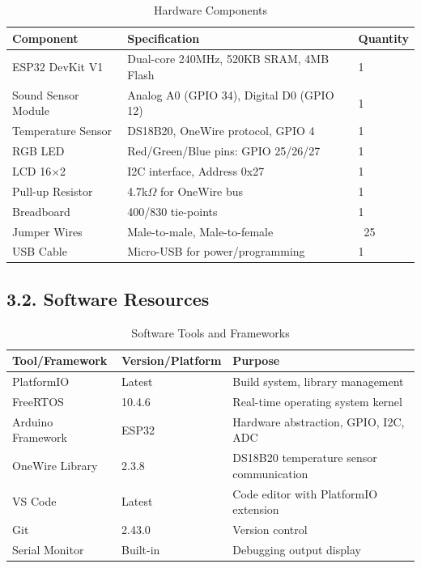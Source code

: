 \documentclass[12pt]{article}
\begin{document}
\begin{table}[H]
	\centering
	\caption{Hardware Components}
	\label{tab:hardware-resources}
	\begin{tabular}{|l|l|l|}
		\hline
		\textbf{Component} & \textbf{Specification} & \textbf{Quantity} \\
		\hline
		ESP32 DevKit V1 & Dual-core 240MHz, 520KB SRAM, 4MB Flash & 1 \\
		\hline
		Sound Sensor Module & Analog A0 (GPIO 34), Digital D0 (GPIO 12) & 1 \\
		\hline
		Temperature Sensor & DS18B20, OneWire protocol, GPIO 4 & 1 \\
		\hline
		RGB LED & Red/Green/Blue pins: GPIO 25/26/27 & 1 \\
		\hline
		LCD 16×2 & I2C interface, Address 0x27 & 1 \\
		\hline
		Pull-up Resistor & 4.7k$\Omega$ for OneWire bus & 1 \\
		\hline
		Breadboard & 400/830 tie-points & 1 \\
		\hline
		Jumper Wires & Male-to-male, Male-to-female & ~25 \\
		\hline
		USB Cable & Micro-USB for power/programming & 1 \\
		\hline
	\end{tabular}
\end{table}

\subsection*{3.2. Software Resources}

\begin{table}[H]
	\centering
	\caption{Software Tools and Frameworks}
	\label{tab:software-resources}
	\begin{tabular}{|l|l|l|}
		\hline
		\textbf{Tool/Framework} & \textbf{Version/Platform} & \textbf{Purpose} \\
		\hline
		PlatformIO & Latest & Build system, library management \\
		\hline
		FreeRTOS & 10.4.6 & Real-time operating system kernel \\
		\hline
		Arduino Framework & ESP32 & Hardware abstraction, GPIO, I2C, ADC \\
		\hline
		OneWire Library & 2.3.8 & DS18B20 temperature sensor communication \\
		\hline
		VS Code & Latest & Code editor with PlatformIO extension \\
		\hline
		Git & 2.43.0 & Version control \\
		\hline
		Serial Monitor & Built-in & Debugging output display \\
		\hline
	\end{tabular}
\end{table}
\end{document}
